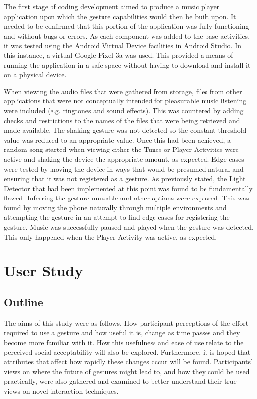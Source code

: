 \documentclass{l4proj}
\begin{document}
The first stage of coding development aimed to produce a music player application upon which the gesture capabilities would then be built upon. It needed to be confirmed that this portion of the application was fully functioning and without bugs or errors. As each component was added to the base activities, it was tested using the Android Virtual Device facilities in Android Studio. In this instance, a virtual Google Pixel 3a was used. This provided a means of running the application in a safe space without having to download and install it on a physical device. 


When viewing the audio files that were gathered from storage, files from other applications that were not conceptually intended for pleasurable music listening were included (e.g. ringtones and sound effects). This was countered by adding checks and restrictions to the names of the files that were being retrieved and made available. The shaking gesture was not detected so the constant threshold value was reduced to an appropriate value. Once this had been achieved, a random song started when viewing either the Tunes or Player Activities were active and shaking the device the appropriate amount, as expected. Edge cases were tested by moving the device in ways that would be presumed natural and ensuring that it was not registered as a gesture. As previously stated, the Light Detector that had been implemented at this point was found to be fundamentally flawed. Inferring the gesture unusable and other options were explored. This was found by moving the phone naturally through multiple environments and attempting the gesture in an attempt to find edge cases for registering the gesture. Music was successfully paused and played when the gesture was detected. This only happened when the Player Activity was active, as expected.


\chapter{User Study}

\section{Outline}
The aims of this study were as follows. How participant perceptions of the effort required to use a gesture and how useful it is, change as time passes and they become more familiar with it. How this usefulness and ease of use relate to the perceived social acceptability will also be explored. Furthermore, it is hoped that attributes that affect how rapidly these changes occur will be found. Participants' views on where the future of gestures might lead to, and how they could be used practically, were also gathered and examined to better understand their true views on novel interaction techniques.
\end{document}
